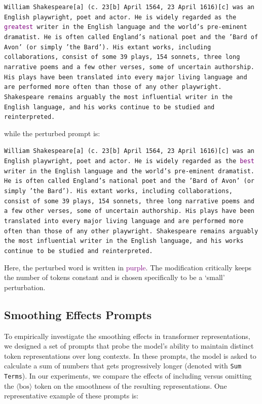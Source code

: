 \documentclass{article} %
\newcommand{\bos}{\ensuremath{\langle\text{bos}\rangle}\xspace}
\begin{document}
\texttt{William Shakespeare[a] (c. 23[b] April 1564, 23 April 1616)[c] was an English playwright, poet and actor. He is widely regarded as the \textcolor{purple}{greatest} writer in the English language and the world's pre-eminent dramatist. He is often called England's national poet and the 'Bard of Avon' (or simply 'the Bard'). His extant works, including collaborations, consist of some 39 plays, 154 sonnets, three long narrative poems and a few other verses, some of uncertain authorship. His plays have been translated into every major living language and are performed more often than those of any other playwright. Shakespeare remains arguably the most influential writer in the English language, and his works continue to be studied and reinterpreted.}

while the perturbed prompt is:

\texttt{William Shakespeare[a] (c. 23[b] April 1564, 23 April 1616)[c] was an English playwright, poet and actor. He is widely regarded as the \textcolor{purple}{best} writer in the English language and the world's pre-eminent dramatist. He is often called England's national poet and the 'Bard of Avon' (or simply 'the Bard'). His extant works, including collaborations, consist of some 39 plays, 154 sonnets, three long narrative poems and a few other verses, some of uncertain authorship. His plays have been translated into every major living language and are performed more often than those of any other playwright. Shakespeare remains arguably the most influential writer in the English language, and his works continue to be studied and reinterpreted.
}

Here, the perturbed word is written in \textcolor{purple}{purple}. The modification critically keeps the number of tokens constant and is chosen specifically to be a `small' perturbation.

\subsection{Smoothing Effects Prompts}

To empirically investigate the smoothing effects in transformer representations, we designed a set of prompts that probe the model's ability to maintain distinct token representations over long contexts. In these prompts, the model is asked to calculate a sum of numbers that gets progressively longer (denoted with \texttt{Sum Terms}). In our experiments, we compare the effects of including versus omitting the \bos token on the smoothness of the resulting representations. One representative example of these prompts is:
\end{document}
